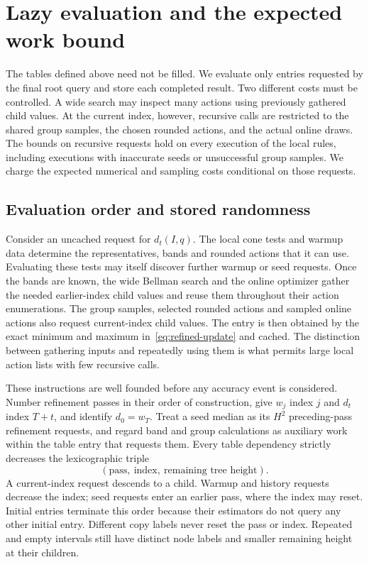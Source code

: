 \section{Lazy evaluation and the expected work bound}
\label{sec:work}

The tables defined above need not be filled.  We evaluate only entries
requested by the final root query and store each completed result.
Two different costs must be controlled.  A wide search may inspect many
actions using previously gathered child values.  At the current index,
however, recursive calls are restricted to the shared group samples,
the chosen rounded actions, and the actual online draws.  The bounds
on recursive requests hold on every execution of the local rules,
including executions with inaccurate seeds or unsuccessful group
samples.  We charge the expected numerical and sampling costs
conditional on those requests.

\subsection{Evaluation order and stored randomness}

Consider an uncached request for $d_t(I,q)$.  The local cone tests and
warmup data determine the representatives, bands and rounded actions
that it can use.  Evaluating these tests may itself discover further
warmup or seed requests.  Once the bands are known, the wide Bellman
search and the online optimizer gather the needed earlier-index child
values and reuse them throughout their action enumerations.  The group
samples, selected rounded actions and sampled online actions also
request current-index child values.  The entry is then obtained by
the exact minimum and maximum in~\eqref{eq:refined-update} and cached.
The distinction between gathering inputs and repeatedly using them is
what permits large local action lists with few recursive calls.

These instructions are well founded before any accuracy event is
considered.  Number refinement passes in their order of construction,
give $w_j$ index $j$ and $d_t$ index $T+t$, and identify $d_0=w_T$.
Treat a seed median as its $H^2$ preceding-pass refinement requests,
and regard band and group calculations as auxiliary work within the
table entry that requests them.  Every table dependency strictly
decreases the lexicographic triple
\[
 (\text{pass},\ \text{index},\ \text{remaining tree height}).
\]
A current-index request descends to a child.  Warmup and history
requests decrease the index; seed requests enter an earlier pass,
where the index may reset.  Initial entries terminate this order
because their estimators do not query any other initial entry.
Different copy labels never reset the pass or index.  Repeated and
empty intervals still have distinct node labels and smaller remaining
height at their children.

